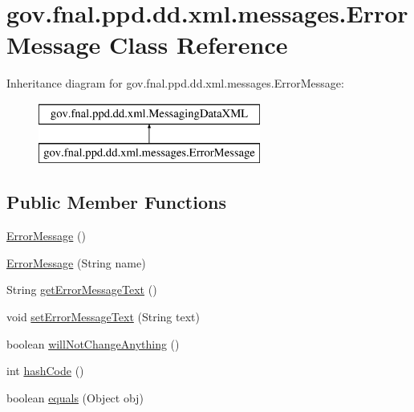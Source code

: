 \hypertarget{classgov_1_1fnal_1_1ppd_1_1dd_1_1xml_1_1messages_1_1ErrorMessage}{\section{gov.\-fnal.\-ppd.\-dd.\-xml.\-messages.\-Error\-Message Class Reference}
\label{classgov_1_1fnal_1_1ppd_1_1dd_1_1xml_1_1messages_1_1ErrorMessage}
}
Inheritance diagram for gov.\-fnal.\-ppd.\-dd.\-xml.\-messages.\-Error\-Message\-:\begin{figure}[H]
\begin{center}
\leavevmode
\includegraphics[height=2.000000cm]{classgov_1_1fnal_1_1ppd_1_1dd_1_1xml_1_1messages_1_1ErrorMessage}
\end{center}
\end{figure}
\subsection*{Public Member Functions}
\begin{DoxyCompactItemize}
\item 
\hyperlink{classgov_1_1fnal_1_1ppd_1_1dd_1_1xml_1_1messages_1_1ErrorMessage_abd8f8a3938c1ba67adcea29f8cc50832}{Error\-Message} ()
\item 
\hyperlink{classgov_1_1fnal_1_1ppd_1_1dd_1_1xml_1_1messages_1_1ErrorMessage_aafbd59ec35884901d3c530680489d075}{Error\-Message} (String name)
\item 
String \hyperlink{classgov_1_1fnal_1_1ppd_1_1dd_1_1xml_1_1messages_1_1ErrorMessage_a75afa5bffa52d1dec9229c82062a0b6d}{get\-Error\-Message\-Text} ()
\item 
void \hyperlink{classgov_1_1fnal_1_1ppd_1_1dd_1_1xml_1_1messages_1_1ErrorMessage_a269c7f1eaf795a7a6a3803ce567e8607}{set\-Error\-Message\-Text} (String text)
\item 
boolean \hyperlink{classgov_1_1fnal_1_1ppd_1_1dd_1_1xml_1_1messages_1_1ErrorMessage_a730d05a055e96b98ef0e6723cd3d85a9}{will\-Not\-Change\-Anything} ()
\item 
int \hyperlink{classgov_1_1fnal_1_1ppd_1_1dd_1_1xml_1_1messages_1_1ErrorMessage_a835f9f39c5379b96cc772d1cc6c39ecd}{hash\-Code} ()
\item 
boolean \hyperlink{classgov_1_1fnal_1_1ppd_1_1dd_1_1xml_1_1messages_1_1ErrorMessage_a1a3858d7b600d60db4f5d1d9e1941987}{equals} (Object obj)
\end{DoxyCompactItemize}


